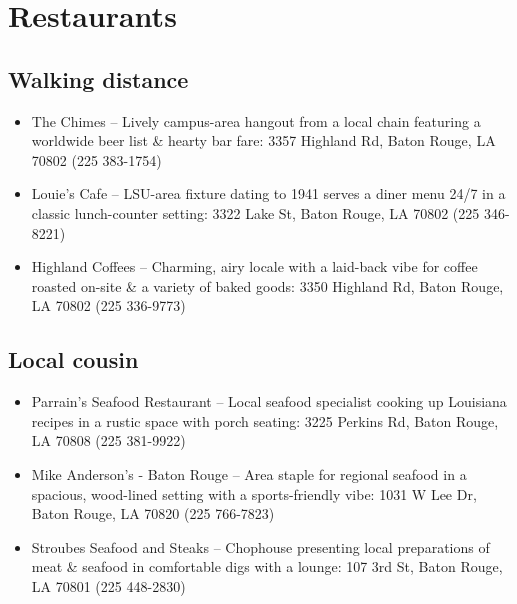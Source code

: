 \documentclass[12pt]{book}
\begin{document}
\section{Restaurants}

\subsection*{Walking distance}

\begin{itemize}
\item The Chimes -- Lively campus-area hangout from a local chain featuring a worldwide beer list \& hearty bar fare: 3357 Highland Rd, Baton Rouge, LA 70802 (225 383-1754)
\item Louie's Cafe -- LSU-area fixture dating to 1941 serves a diner menu 24/7 in a classic lunch-counter setting: 3322 Lake St, Baton Rouge, LA 70802 (225 346-8221)
\item Highland Coffees -- Charming, airy locale with a laid-back vibe for coffee roasted on-site \& a variety of baked goods: 3350 Highland Rd, Baton Rouge, LA 70802 (225 336-9773)
\end{itemize}

\subsection*{Local cousin}

\begin{itemize}
\item Parrain's Seafood Restaurant -- Local seafood specialist cooking up Louisiana recipes in a rustic space with porch seating: 3225 Perkins Rd, Baton Rouge, LA 70808 (225 381-9922)
\item Mike Anderson's - Baton Rouge -- Area staple for regional seafood in a spacious, wood-lined setting with a sports-friendly vibe: 1031 W Lee Dr, Baton Rouge, LA 70820 (225 766-7823)
\item Stroubes Seafood and Steaks -- Chophouse presenting local preparations of meat \& seafood in comfortable digs with a lounge: 107 3rd St, Baton Rouge, LA 70801 (225 448-2830)
\end{itemize}


\backmatter
\renewcommand{\indexname}{Author Index}
\printindex
\newpage
\doclicenseThis 
\end{document}
